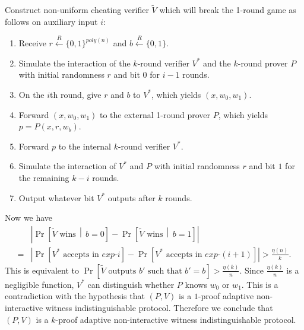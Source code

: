 \documentclass[draft]{article}
\newcommand{\getr}{\overset{R}{\gets}}
\begin{document}
\begin{enumerate}
  Construct non-uniform cheating verifier $\tilde{V}$ which will break the 1-round game as follows on auxiliary input $i$:
  \begin{enumerate}
  \item Receive $r\getr\{0,1\}^{poly(n)}$ and $b\getr\{0, 1\}$.
  \item Simulate the interaction of the $k$-round verifier $V^*$ and the $k$-round prover $P$ with initial randomness $r$ and bit $0$ for $i - 1$ rounds.
  \item On the $i$th round, give $r$ and $b$ to $V^*$, which yields $(x, w_0, w_1)$.
  \item Forward $(x, w_0, w_1)$ to the external 1-round prover $P$, which yields $p=P(x, r, w_b)$.
  \item Forward $p$ to the internal $k$-round verifier $V^*$.
  \item Simulate the interaction of $V^*$ and $P$ with initial randomness $r$ and bit $1$ for the remaining $k - i$ rounds.
  \item Output whatever bit $V^*$ outputs after $k$ rounds.
  \end{enumerate}

  Now we have
  \begin{align*}
    & \left|\Pr\left[\tilde{V} \text{ wins} \,\middle|\, b=0\right] - \Pr\left[\tilde{V} \text{ wins} \,\middle|\, b=1\right]\right| \\
    = & \left|\Pr\left[V^*\text{ accepts in } exp\mbox{-}i\right] - \Pr\left[V^*\text{ accepts in } exp\mbox{-}(i+1)\right]\right| > \frac{\eta(n)}{k}.
  \end{align*}
  This is equivalent to $\Pr[\tilde{V}\text{ outputs } b' \text{ such that } b'=b] > \frac{\eta(k)}{n}$.
  Since $\frac{\eta(k)}{n}$ is a negligible function, $V^*$ can distinguish whether $P$ knows $w_0$ or $w_1$.
  This is a contradiction with the hypothesis that $(P, V)$ is a $1$-proof adaptive non-interactive witness indistinguishable protocol.
  Therefore we conclude that $(P, V)$ is a $k$-proof adaptive non-interactive witness indistinguishable protocol.
\end{enumerate}
\end{document}
